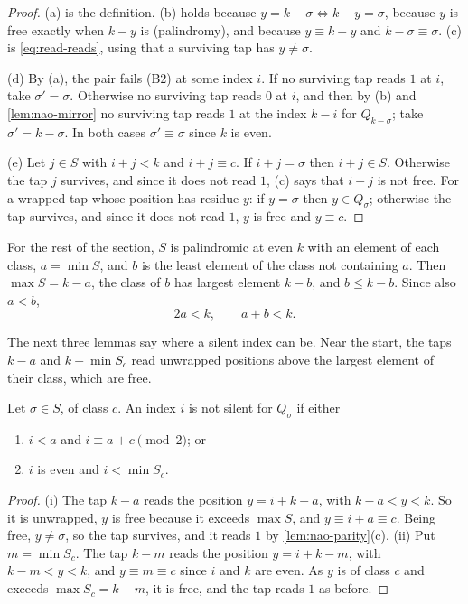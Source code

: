 \begin{proof}
(a) is the definition. (b) holds because $y=k-\sigma\iff k-y=\sigma$, because
$y$ is free exactly when $k-y$ is (palindromy), and because $y\equiv k-y$
and $k-\sigma\equiv\sigma$.
(c) is \eqref{eq:read-reads}, using that a surviving tap has $y\ne\sigma$.

(d) By (a), the pair fails (B2) at some index $i$. If no surviving tap reads
$1$ at $i$, take $\sigma'=\sigma$. Otherwise no surviving tap reads $0$ at
$i$, and then by (b) and \autoref{lem:nao-mirror} no surviving tap reads $1$
at the index $k-i$ for $Q_{k-\sigma}$; take $\sigma'=k-\sigma$. In both
cases $\sigma'\equiv\sigma$ since $k$ is even.

(e) Let $j\in S$ with $i+j<k$ and $i+j\equiv c$. If $i+j=\sigma$ then
$i+j\in S$. Otherwise the tap $j$ survives, and since it does not read $1$,
(c) says that $i+j$ is not free. For a wrapped tap whose position has residue
$y$: if $y=\sigma$ then $y\in Q_\sigma$; otherwise the tap survives, and since it
does not read $1$, $y$ is free and $y\equiv c$.
\end{proof}

For the rest of the section, $S$ is palindromic at even $k$ with an element
of each class, $a=\min S$, and $b$ is the least element of the class not
containing $a$. Then $\max S=k-a$, the class of $b$ has largest element
$k-b$, and $b\le k-b$. Since also $a<b$,
\begin{equation}
2a<k,\qquad a+b<k .
\label{eq:nao-ab}
\end{equation}

The next three lemmas say where a silent index can be. Near the start, the
taps $k-a$ and $k-\min S_c$ read unwrapped positions above the largest
element of their class, which are free.

\begin{lemma}
\label{lem:nao-ends}
Let $\sigma\in S$, of class $c$. An index $i$ is not silent for $Q_\sigma$
if either
\begin{enumerate}
\item[(i)] $i<a$ and $i\equiv a+c\pmod2$; or
\item[(ii)] $i$ is even and $i<\min S_c$.
\end{enumerate}
\end{lemma}

\begin{proof}
(i) The tap $k-a$ reads the position $y=i+k-a$, with $k-a<y<k$. So it is unwrapped,
$y$ is free because it exceeds $\max S$, and $y\equiv i+a\equiv c$. Being
free, $y\ne\sigma$, so the tap survives, and it reads $1$ by
\autoref{lem:nao-parity}(c).
(ii) Put $m=\min S_c$. The tap $k-m$ reads the position $y=i+k-m$, with $k-m<y<k$, and
$y\equiv m\equiv c$ since $i$ and $k$ are even. As $y$ is of class $c$ and
exceeds $\max S_c=k-m$, it is free, and the tap reads $1$ as before.
\end{proof}

